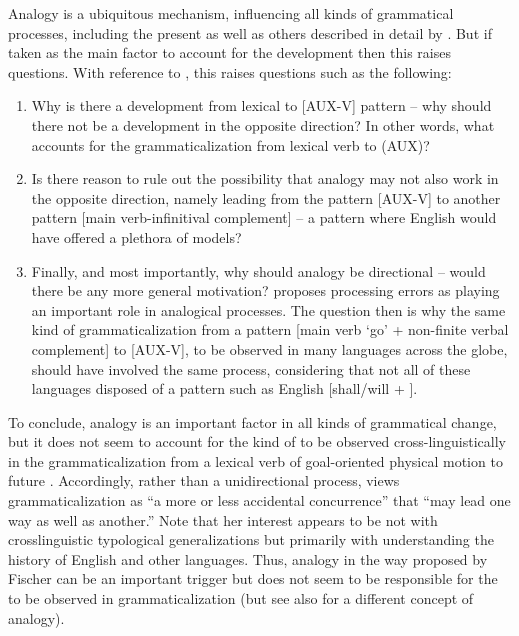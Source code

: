 \documentclass[output=paper]{langsci/langscibook}
\begin{document}
  Analogy is a ubiquitous mechanism, influencing all kinds of grammatical processes, including the present as well as others described in detail by \citet{Fischer2013}. But if taken as the main factor to account for the development then this raises questions. With reference to , this raises questions such as the following: 

\begin{enumerate}[label=(\alph*)]
\item Why is there a development from lexical to [AUX-V] pattern – why should there not be a development in the opposite direction? In other words, what accounts for the grammaticalization from lexical verb to  (AUX)? 
\item Is there reason to rule out the possibility that analogy may not also work in the opposite direction, namely leading from the pattern [AUX-V] to another pattern [main verb-infinitival complement] – a pattern where English would have offered a plethora of models? 
\item  Finally, and most importantly, why should analogy be directional – would there be any more general motivation? \citet[521]{Fischer2013} proposes processing errors as playing an important role in analogical processes. The question then is why the same kind of grammaticalization from a pattern [main verb ‘go’ + non-finite verbal complement] to [AUX-V], to be observed in many languages across the globe, should have involved the same process, considering that not all of these languages disposed of a pattern such as English [{shall/will} + ].
\end{enumerate}


To conclude, analogy is an important factor in all kinds of grammatical change, but it does not seem to account for the kind of  to be observed cross-linguistically in the grammaticalization from a lexical verb of goal-oriented physical motion to future . Accordingly, rather than a unidirectional process, \citet[153]{Fischer2000} views grammaticalization as “a more or less accidental concurrence” that “may lead one way as well as another.” Note that her interest appears to be not with crosslinguistic typological generalizations but primarily with understanding the history of English and other  languages. Thus, analogy in the way proposed by Fischer can be an important trigger but does not seem to be responsible for the  to be observed in grammaticalization (but see also \citealt{Kiparsky2012} for a different concept of analogy).
\end{document}
